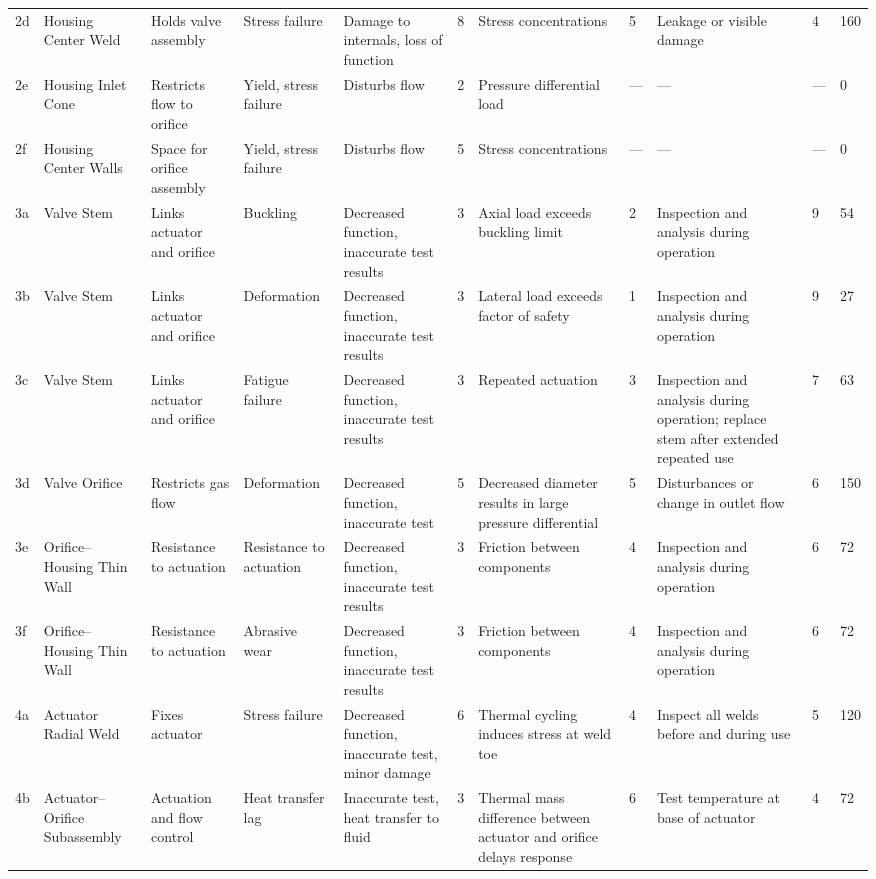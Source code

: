 \documentclass{article}
\begin{document}
\begin{table}[h]
\begin{tabular}{
				W{0.45in}
				W{0.9in}
				W{0.85in}
				W{1.0in}
				W{1.2in}
				W{1in}
				W{1.3in}
				W{1.2in}
				W{1.35in}
				W{0.85in}
				W{1.4in}
			}
			2d & Housing Center Weld & Holds valve assembly & Stress failure & Damage to internals, loss of function & 8 & Stress concentrations & 5 & Leakage or visible damage & 4 & 160 \\

			2e & Housing Inlet Cone & Restricts flow to orifice & Yield, stress failure & Disturbs flow & 2 & Pressure differential load & --- & --- & --- & 0 \\
			2f & Housing Center Walls & Space for orifice assembly & Yield, stress failure & Disturbs flow & 5 & Stress concentrations & --- & --- & --- & 0 \\
			3a & Valve Stem & Links actuator and orifice & Buckling & Decreased function, inaccurate test results & 3 & Axial load exceeds buckling limit & 2 & Inspection and analysis during operation & 9 & 54 \\
			3b & Valve Stem & Links actuator and orifice & Deformation & Decreased function, inaccurate test results & 3 & Lateral load exceeds factor of safety & 1 & Inspection and analysis during operation & 9 & 27 \\
			3c & Valve Stem & Links actuator and orifice & Fatigue failure & Decreased function, inaccurate test results & 3 & Repeated actuation & 3 & Inspection and analysis during operation; replace stem after extended repeated use & 7 & 63 \\

			3d & Valve Orifice & Restricts gas flow & Deformation & Decreased function, inaccurate test & 5 & Decreased diameter results in large pressure differential & 5 & Disturbances or change in outlet flow & 6 & 150 \\

			3e & Orifice--Housing Thin Wall & Resistance to actuation & Resistance to actuation & Decreased function, inaccurate test results & 3 & Friction between components & 4 & Inspection and analysis during operation & 6 & 72 \\
			3f & Orifice--Housing Thin Wall & Resistance to actuation & Abrasive wear & Decreased function, inaccurate test results & 3 & Friction between components & 4 & Inspection and analysis during operation & 6 & 72 \\

			4a & Actuator Radial Weld & Fixes actuator & Stress failure & Decreased function, inaccurate test, minor damage & 6 & Thermal cycling induces stress at weld toe & 4 & Inspect all welds before and during use & 5 & 120 \\

			4b & Actuator--Orifice Subassembly & Actuation and flow control & Heat transfer lag & Inaccurate test, heat transfer to fluid & 3 & Thermal mass difference between actuator and orifice delays response & 6 & Test temperature at base of actuator & 4 & 72 \\

			\bottomrule
			\end{tabular}
			\label{tab:RPN_full}
			\end{table}
\end{document}
